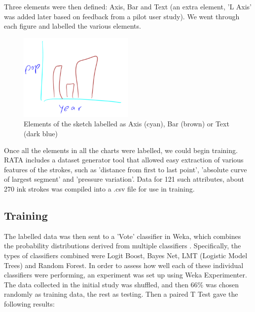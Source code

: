 	Three elements were then defined: Axis, Bar and Text (an extra element, 'L Axis' was added later based on feedback from a pilot user study). We went through each figure and labelled the various elements.
	
	\begin{figure}[h]
		\centering
		\includegraphics[width=0.5\textwidth]{collection_labelled}
		\caption{Elements of the sketch labelled as Axis (cyan), Bar (brown) or Text (dark blue)}
		\label{fig:collection_labelled}
	\end{figure}

	Once all the elements in all the charts were labelled, we could begin training. RATA includes a dataset generator tool that allowed easy extraction of various features of the strokes, such as 'distance from first to last point', 'absolute curve of largest segment' and 'pressure variation'. Data for 121 such attributes, about 270 ink strokes was compiled into a .csv file for use in training. 
	\subsection{Training}	
	The labelled data was then sent to a 'Vote' classifier in Weka, which combines the probability distributions derived from multiple classifiers \citep{kuncheva_combining_2004}. Specifically, the types of classifiers combined were Logit Boost, Bayes Net, LMT (Logistic Model Trees) and Random Forest. In order to assess how well each of these individual classifiers were performing, an experiment was set up using Weka Experimenter. The data collected in the initial study was shuffled, and then 66\% was chosen randomly as training data, the rest as testing. Then a paired T Test gave the following results:
	
	
